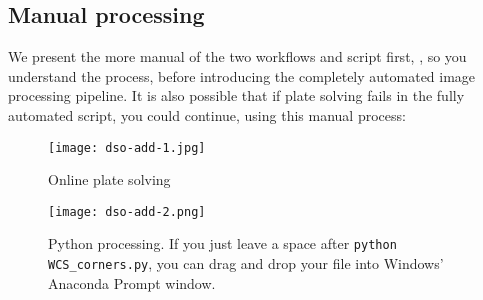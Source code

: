 \subsection{Manual processing}
\label{sec:dso:adding_images:manual}

We present the more manual of the two workflows and script first,
, so you understand the process, before
introducing the completely automated image processing pipeline. It is
also possible that if plate solving fails in the fully automated
script, you could continue, using this  manual process:

\begin{figure}[htbp]
\centering\texttt{[image: dso-add-1.jpg]}
\caption{Online plate solving}
\label{fig:dso:adding_images:manual:plate-solving}
\end{figure}
\begin{figure}[htbp]
\centering\texttt{[image: dso-add-2.png]}
\caption{Python processing. If you just leave a space after \texttt{python WCS\_corners.py},
you can drag and drop your  file into Windows' Anaconda Prompt window.}
\label{fig:dso:adding_images:manual:python}
\end{figure}

